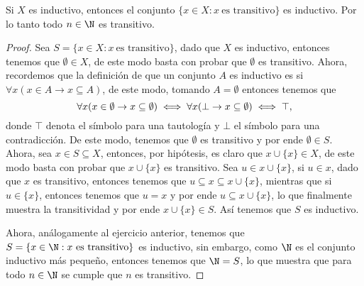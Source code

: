 \begin{exercise}[1.4]
  Si $X$ es inductivo, entonces el conjunto $\{ x \in X: x \ \text{es transitivo}\}$ es inductivo. Por lo tanto todo $n \in \N$ es transitivo.
\end{exercise}
\begin{proof}
  Sea $S = \{ x \in X: x \ \text{es transitivo}\}$, dado que $X$ es inductivo, entonces tenemos que $\emptyset \in X$, de este modo basta con probar que $\emptyset$ es transitivo. Ahora, recordemos que la definición de que un conjunto $A$ es inductivo es si $\forall x (x \in A \to x \subseteq A)$, de este modo, tomando $A = \emptyset$ entonces tenemos que 
  \[
    \forall x (x \in \emptyset \lthen x \subseteq \emptyset) \iff \forall x (\lfalse \lthen x \subseteq \emptyset) \iff \ltrue,
  \]
  donde $\top$ denota el símbolo para una tautología y $\bot$ el símbolo para una contradicción. De este modo, tenemos que $\emptyset$ es transitivo y por ende $\emptyset \in S$. Ahora, sea $x \in S \subseteq X$, entonces, por hipótesis, es claro que $x \cup \{x\} \in X$, de este modo basta con probar que $x \cup \{x\}$ es transitivo. Sea $u \in x \cup \{x\}$, si $u \in x$, dado que $x$ es transitivo, entonces tenemos que $u \subseteq x \subseteq x \cup \{x\}$, mientras que si $u \in \{x\}$, entonces tenemos que $u = x$ y por ende $u \subseteq x \cup \{x\}$, lo que finalmente muestra la transitividad y por ende $x \cup \{x\} \in S$. Así tenemos que $S$ es inductivo.

  Ahora, análogamente al ejercicio anterior, tenemos que $S = \{ x \in \N: x \ \text{es transitivo}\}$ es inductivo, sin embargo, como $\N$ es el conjunto inductivo más pequeño, entonces tenemos que $\N = S$, lo que muestra que para todo $n \in \N$ se cumple que $n$ es transitivo.
\end{proof}